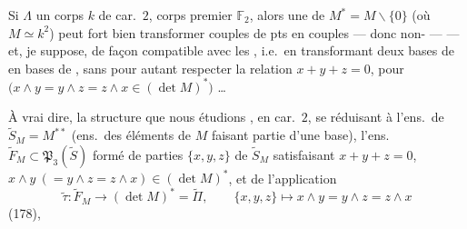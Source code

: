 \documentclass[11pt,a4paper]{article}
\begin{document}
Si $\Lambda$  un corps $k$ de car.\ $2$, \struck{\ill{}} corps premier $\mathbb{F}_2$, alors une   de $M^{*}=M\smallsetminus\{0\}$ (où $M\simeq k^2$) peut fort bien transformer couples de pts    en couples   --- donc non-  ---  --- et, je suppose, de façon compatible avec les , i.e.\ en transformant \struck{\ill{}} deux bases de  en \struck{\ill{}} bases de , sans pour autant respecter la relation $x+y+z=0$, pour $\bigl(x\wedge y=y\wedge z=z\wedge x\in(\det M)^{*}\bigr)$ …

À vrai dire, la structure que nous étudions , en car.\ $2$, se réduisant à l'ens.\ de $\widetilde{S}_M = M^{**}$ (ens.\ des éléments de $M$ faisant partie d'une base), l'ens.\ $\widetilde{F}_M \subset \mathfrak{P}_3(\widetilde{S})$ formé de parties $\{x,y,z\}$ de $\widetilde{S}_M$ satisfaisant $x+y+z=0$, $x\wedge y\ (=y\wedge z=z\wedge x)\in(\det M)^{*}$, et de l'application
\[
\widetilde{\tau} : \widetilde{F}_M \longrightarrow (\det M)^{*} = \widetilde{\Pi},
\qquad \{x,y,z\}\longmapsto x\wedge y = y\wedge z = z\wedge x
\]
(178),
\end{document}
